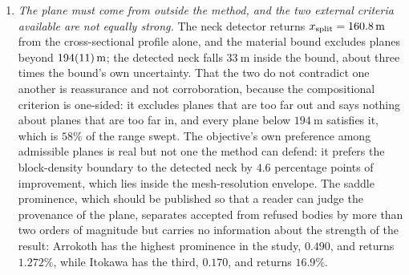 \begin{enumerate}
\item \emph{The plane must come from outside the method, and the two
external criteria available are not equally strong.} The neck detector
returns $x_{\mathrm{split}} = \SI{160.8}{\metre}$ from the cross-sectional profile
alone, and the material bound excludes planes beyond
$\SI{194+-11}{\metre}$; the detected neck falls $\SI{33}{\metre}$ inside
the bound, about three times the bound's own uncertainty. That the two do
not contradict one another is reassurance and not corroboration, because
the compositional criterion is one-sided: it excludes planes that are too
far out and says nothing about planes that are too far in, and every plane
below $\SI{194}{\metre}$ satisfies it, which is $58\%$ of the range swept.
The objective's own preference among admissible planes is real but not one
the method can defend: it prefers the block-density boundary to the
detected neck by $4.6$ percentage points of improvement, which lies inside
the mesh-resolution envelope. The saddle prominence, which should be
published so that a reader can judge the provenance of the plane,
separates accepted from refused bodies by more than two orders of
magnitude but carries no information about the strength of the result:
Arrokoth has the highest prominence in the study, $0.490$, and returns
$1.272\%$, while Itokawa has the third, $0.170$, and returns $16.9\%$.


\end{enumerate}
